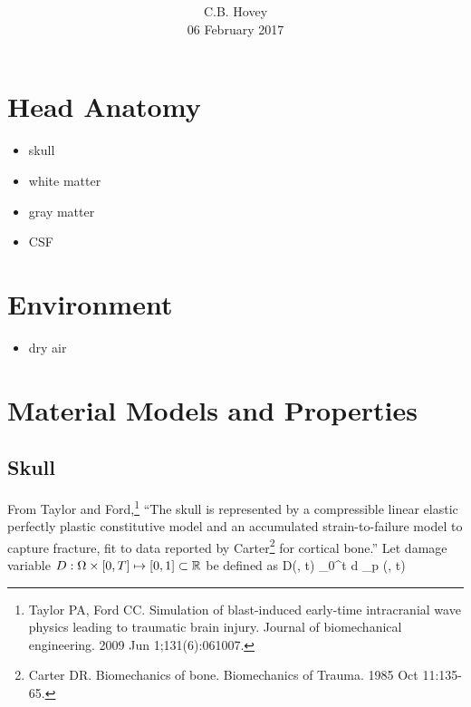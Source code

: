 \documentclass[12pt,reqno]{amsart}
\title{\bfseries \cbhTitle}
\author{C.B. Hovey \\ \tiny 06 February 2017}
\begin{document}

\maketitle


\section{Head Anatomy}
\begin{itemize}
\item skull 
\item white matter
\item gray matter
\item CSF
\end{itemize}

\section{Environment}
\begin{itemize}
\item dry air
\end{itemize}

%
%
%
%
%




\section{Material Models and Properties}
\subsection{Skull}
From Taylor and 
Ford,\footnote{Taylor PA, Ford CC. Simulation of 
blast-induced early-time intracranial wave physics leading to traumatic brain 
injury. Journal of biomechanical engineering. 2009 Jun 1;131(6):061007.}
``The skull is represented by a compressible linear elastic
perfectly plastic constitutive model and an accumulated strain-to-failure 
model to capture fracture, fit to data reported by 
Carter\footnote{Carter DR. Biomechanics of bone. Biomechanics of Trauma. 
1985 Oct 11:135-65.}
for cortical bone.''
Let damage variable 
$D : \Omega \times [0, T] \mapsto [0, 1] \subset \mathbb{R}$
be defined as
\be
 D(\vx, t)  {} \int_0^t d \epsilon_p (\vx, t)
\ee
\end{document}
